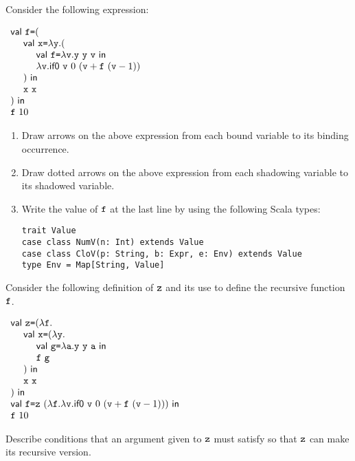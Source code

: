 \begin{exercise}

Consider the following expression:

$\begin{array}{l}
  \ebind{\cf}{(\\
  \ \ \ \ \ebind{\cx}{\efun{\cy}{(\\
  \ \ \ \ \ \ \ \ \ebind{\cf}{\efun{\cv}{\eapp{\eapp{\cy}{\cy}}{\cv}}}{\\
  \ \ \ \ \ \ \ \ \efun{\cv}{\sumbodyfv}}\\
  \ \ \ \ )}}{\\
  \ \ \ \ \eapp{\cx}{\cx}\\
  )}}{\\
  \eapp{\cf}{10}
  }
\end{array}$

\begin{enumerate}
\item Draw arrows on the above expression from each bound variable to its binding occurrence.
\item Draw dotted arrows on the above expression from each shadowing variable to its shadowed variable.
\item Write the value of $\texttt{f}$ at the last line by using the following Scala types:
\begin{verbatim}
trait Value
case class NumV(n: Int) extends Value
case class CloV(p: String, b: Expr, e: Env) extends Value
type Env = Map[String, Value]
\end{verbatim}
\end{enumerate}

\end{exercise}

\begin{exercise}

Consider the following definition of $\texttt{z}$ and its use to define the recursive
function $\texttt{f}$.

$\begin{array}{l}
  \ebind{\cz}{(\efun{\cf}{\\
  \ \ \ \ \ebind{\cx}{(\efun{\cy}{\\
  \ \ \ \ \ \ \ \ \ebind{\code{g}}{\efun{\code{a}}{\eapp{\eapp{\cy}{\cy}}{\code{a}}}}{\\
  \ \ \ \ \ \ \ \ \eapp{\cf}{\code{g}}}}\\
  \ \ \ \ )}{\\
  \ \ \ \ \eapp{\cx}{\cx}}}\\
  )}{\\
  \ebind{\cf}{\eapp{\cz}{(\efun{\cf}{\efun{\cv}{\sumbodyfv}})}}{\\
  \eapp{\cf}{10}
  }
}
\end{array}$

Describe conditions that an argument given to $\texttt{z}$ must satisfy so that $\texttt{z}$
    can make its recursive version.

\end{exercise}

